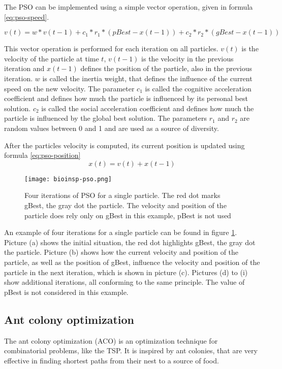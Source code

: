 The PSO can be implemented using a simple vector operation, given in formula \eqref{eq:pso-speed}.

\begin{equation}\label{eq:pso-speed}
  v(t) = w * v(t - 1) + c_1 * r_1 * (pBest - x(t - 1)) + c_2 * r_2 * (gBest - x(t - 1))
\end{equation}

This vector operation is performed for each iteration on all particles. $v(t)$ is the velocity of the particle at time $t$, $v(t - 1)$ is the velocity in the previous iteration and $x(t - 1)$ defines the position of the particle, also in the previous iteration. $w$ is called the inertia weight, that defines the influence of the current speed on the new velocity. The parameter $c_1$ is called the cognitive acceleration coefficient and defines how much the particle is influenced by its personal best solution. $c_2$ is called the social acceleration coefficient and defines how much the particle is influenced by the global best solution. The parameters $r_1$ and $r_2$ are random values between 0 and 1 and are used as a source of diversity.

After the particles velocity is computed, its current position is updated using formula \eqref{eq:pso-position}
\begin{equation}\label{eq:pso-position}
  x(t) = v(t) + x(t - 1)
\end{equation}

\begin{figure}[ht!]
  \centering
  \texttt{[image: bioinsp-pso.png]}
  \caption{Four iterations of PSO for a single particle. The red dot marks gBest, the gray dot the particle. The velocity and position of the particle does rely only on gBest in this example, pBest is not used}
  \label{fig:pso}
\end{figure}

An example of four iterations for a single particle can be found in figure \ref{fig:pso}. Picture (a) shows the initial situation, the red dot highlights gBest, the gray dot the particle. Picture (b) shows how the current velocity and position of the particle, as well as the position of gBest, influence the velocity and position of the particle in the next iteration, which is shown in picture (c). Pictures (d) to (i) show additional iterations, all conforming to the same principle. The value of pBest is not considered in this example.

\subsection{Ant colony optimization}
The ant colony optimization (ACO) is an optimization technique for combinatorial problems, like the TSP. It is inspired by ant colonies, that are very effective in finding shortest paths from their nest to a source of food.

